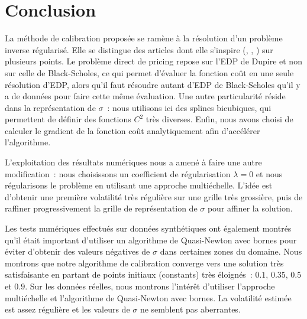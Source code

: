 \section{Conclusion}

La m\'ethode de calibration propos\'ee se ram\`ene \`a la 
r\'esolution d'un probl\`eme inverse r\'egularis\'e. Elle se 
distingue des articles dont elle s'inspire (\cite{lag:jcf:97}, 
\cite{jac:jcf:98}, \cite{col:jcf:99}) sur plusieurs points. Le 
probl\`eme direct de pricing repose sur l'EDP de Dupire et non 
sur celle de Black-Scholes, ce qui permet d'\'evaluer la fonction 
co\^ut en une seule r\'esolution d'EDP, alors qu'il faut r\'esoudre 
autant d'EDP de Black-Scholes qu'il y a de donn\'ees pour faire 
cette m\^eme \'evaluation. Une autre particularit\'e r\'eside dans 
la repr\'esentation de $\sigma$~: nous utilisons ici des splines 
bicubiques, qui permettent de d\'efinir des fonctions $C^2$ tr\`es 
diverses. Enfin, nous avons choisi de calculer le gradient de la 
fonction co\^ut analytiquement afin d'acc\'el\'erer l'algorithme. 

L'exploitation des r\'esultats num\'eriques nous a amen\'e \`a 
faire une autre modification~: nous choisissons un coefficient 
de r\'egularisation $\lambda = 0$ et nous r\'egularisons le 
probl\`eme en utilisant une approche multi\'echelle. L'id\'ee est 
d'obtenir une premi\`ere volatilit\'e tr\`es r\'eguli\`ere sur 
une grille tr\`es grossi\`ere, puis de raffiner progressivement 
la grille de repr\'esentation de $\sigma$ pour affiner la solution. 

Les tests num\'eriques effectu\'es sur donn\'ees synth\'etiques 
ont \'egalement montr\'es qu'il \'etait important d'utiliser un 
algorithme de Quasi-Newton avec bornes pour \'eviter d'obtenir 
des valeurs n\'egatives de $\sigma$ dans certaines zones du 
domaine. Nous montrons que notre algorithme de calibration 
converge vers une solution tr\`es satisfaisante en partant 
de points initiaux (constants) tr\`es \'eloign\'es~: $0.1$, 
$0.35$, $0.5$ et $0.9$. Sur les donn\'ees r\'eelles, nous 
montrons l'int\'er\^et d'utiliser l'approche multi\'echelle 
et l'algorithme de Quasi-Newton avec bornes. La volatilit\'e 
estim\'ee est assez r\'eguli\`ere et les valeurs de $\sigma$ 
ne semblent pas aberrantes.
